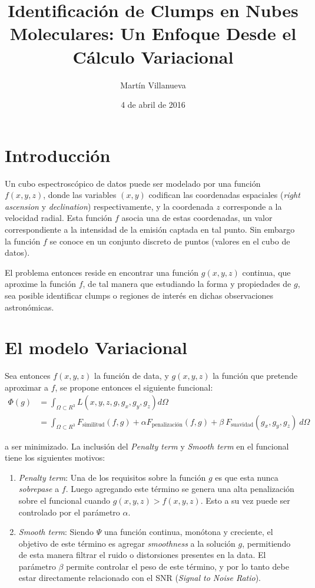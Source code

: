 \documentclass[spanish, fleqn]{article}
\title{Identificación de Clumps en Nubes Moleculares: Un Enfoque Desde el Cálculo Variacional}
\author{Martín Villanueva}
\date{4 de abril de 2016}
\begin{document}
\maketitle


\section{Introducción}
Un cubo espectroscópico de datos puede ser modelado por una función $f(x,y,z)$, donde
las variables $(x,y)$ codifican las coordenadas espaciales (\textit{right ascension} y
\textit{declination}) respectivamente, y la coordenada $z$ corresponde a la velocidad
radial. Esta función $f$ asocia una de estas coordenadas, un valor correspondiente a la
intensidad de la emisión captada en tal punto. Sin embargo la función $f$ se conoce en
un conjunto discreto de puntos (valores en el cubo de datos).

El problema entonces reside en encontrar una función $g(x,y,z)$ continua, que aproxime
la función $f$, de tal manera que estudiando la forma y propiedades de $g$, sea posible
identificar clumps o regiones de interés en dichas observaciones astronómicas.  

\section{El modelo Variacional}

Sea entonces $f(x,y,z)$ la función de data, y $g(x,y,z)$ la función que pretende aproximar
a $f$, se propone entonces el siguiente funcional:
\begin{equation} \label{eq1}
\begin{split}
\Phi(g) & = \int_{\Omega \subset R^3} L(x, y , z , g , g_x, g_y, g_z) d\Omega \\
        & = \int_{\Omega \subset R^3} F_{\text{similitud}}(f,g) + \alpha F_{\text{penalización}}(f,g)
        + \beta \ F_{\text{suavidad}}(g_x, g_y, g_z) \ d\Omega
\end{split}
\end{equation}

\noindent a ser minimizado. La inclusión del \textit{Penalty term} y \textit{Smooth term} en el funcional
tiene los siguientes motivos:

\begin{enumerate}
    \item \textit{Penalty term}: Una de los requisitos sobre la función $g$ es que esta nunca \textit{sobrepase}
    a $f$. Luego agregando este término se genera una alta penalización sobre el funcional cuando $g(x,y,z) > f(x,y,z)$.
    Esto a su vez puede ser controlado por el parámetro $\alpha$.
    \item \textit{Smooth term}: Siendo $\Psi$ una función continua, monótona y creciente, el objetivo de este término
    es agregar \textit{smoothness} a la solución $g$, permitiendo de esta manera filtrar el ruido o distorsiones presentes
    en la data. El parámetro $\beta$ permite controlar el peso de este término, y por lo tanto debe estar directamente
    relacionado con el SNR (\textit{Signal to Noise Ratio}).
\end{enumerate}
\end{document}
